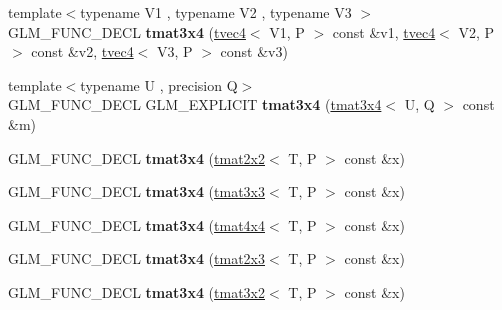 \begin{DoxyCompactItemize}
\item 
\hypertarget{structglm_1_1tmat3x4_a79898618d22d01dd865e88d61aaf9016}{{\footnotesize template$<$typename V1 , typename V2 , typename V3 $>$ }\\G\-L\-M\-\_\-\-F\-U\-N\-C\-\_\-\-D\-E\-C\-L {\bfseries tmat3x4} (\hyperlink{structglm_1_1tvec4}{tvec4}$<$ V1, P $>$ const \&v1, \hyperlink{structglm_1_1tvec4}{tvec4}$<$ V2, P $>$ const \&v2, \hyperlink{structglm_1_1tvec4}{tvec4}$<$ V3, P $>$ const \&v3)}\label{structglm_1_1tmat3x4_a79898618d22d01dd865e88d61aaf9016}

\item 
\hypertarget{structglm_1_1tmat3x4_a605d52801a88671ed149ac1580f913aa}{{\footnotesize template$<$typename U , precision Q$>$ }\\G\-L\-M\-\_\-\-F\-U\-N\-C\-\_\-\-D\-E\-C\-L G\-L\-M\-\_\-\-E\-X\-P\-L\-I\-C\-I\-T {\bfseries tmat3x4} (\hyperlink{structglm_1_1tmat3x4}{tmat3x4}$<$ U, Q $>$ const \&m)}\label{structglm_1_1tmat3x4_a605d52801a88671ed149ac1580f913aa}

\item 
\hypertarget{structglm_1_1tmat3x4_a0ed0439eeabeb33a938b5c1fa0d863b9}{G\-L\-M\-\_\-\-F\-U\-N\-C\-\_\-\-D\-E\-C\-L {\bfseries tmat3x4} (\hyperlink{structglm_1_1tmat2x2}{tmat2x2}$<$ T, P $>$ const \&x)}\label{structglm_1_1tmat3x4_a0ed0439eeabeb33a938b5c1fa0d863b9}

\item 
\hypertarget{structglm_1_1tmat3x4_a03d2fae8e2bee08e4cff77f26f674be8}{G\-L\-M\-\_\-\-F\-U\-N\-C\-\_\-\-D\-E\-C\-L {\bfseries tmat3x4} (\hyperlink{structglm_1_1tmat3x3}{tmat3x3}$<$ T, P $>$ const \&x)}\label{structglm_1_1tmat3x4_a03d2fae8e2bee08e4cff77f26f674be8}

\item 
\hypertarget{structglm_1_1tmat3x4_af6107faa14e8655813db0fc464242ae9}{G\-L\-M\-\_\-\-F\-U\-N\-C\-\_\-\-D\-E\-C\-L {\bfseries tmat3x4} (\hyperlink{structglm_1_1tmat4x4}{tmat4x4}$<$ T, P $>$ const \&x)}\label{structglm_1_1tmat3x4_af6107faa14e8655813db0fc464242ae9}

\item 
\hypertarget{structglm_1_1tmat3x4_a15f3fac4d543da49854067add7993dc9}{G\-L\-M\-\_\-\-F\-U\-N\-C\-\_\-\-D\-E\-C\-L {\bfseries tmat3x4} (\hyperlink{structglm_1_1tmat2x3}{tmat2x3}$<$ T, P $>$ const \&x)}\label{structglm_1_1tmat3x4_a15f3fac4d543da49854067add7993dc9}

\item 
\hypertarget{structglm_1_1tmat3x4_ab235cb72196b66b354ca6db5b3de36ab}{G\-L\-M\-\_\-\-F\-U\-N\-C\-\_\-\-D\-E\-C\-L {\bfseries tmat3x4} (\hyperlink{structglm_1_1tmat3x2}{tmat3x2}$<$ T, P $>$ const \&x)}\label{structglm_1_1tmat3x4_ab235cb72196b66b354ca6db5b3de36ab}


\end{DoxyCompactItemize}
